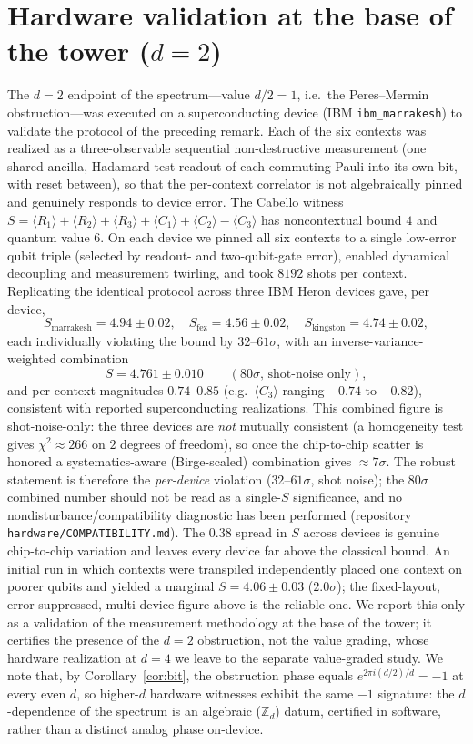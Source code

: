 \documentclass[11pt]{article}
\theoremstyle{remark}
\newcommand{\Z}{\mathbb{Z}}
\begin{document}
\section{Hardware validation at the base of the tower ($d=2$)}
The $d=2$ endpoint of the spectrum---value $d/2=1$, i.e.\ the Peres--Mermin obstruction---was executed
on a superconducting device (IBM \texttt{ibm\_marrakesh}) to validate the protocol of the preceding
remark. Each of the six contexts was realized as a three-observable sequential non-destructive
measurement (one shared ancilla, Hadamard-test readout of each commuting Pauli into its own bit, with
reset between), so that the per-context correlator is not algebraically pinned and genuinely responds
to device error. The Cabello witness
$S=\langle R_1\rangle+\langle R_2\rangle+\langle R_3\rangle+\langle C_1\rangle+\langle C_2\rangle
-\langle C_3\rangle$ has noncontextual bound $4$ and quantum value $6$. On each device we pinned all
six contexts to a single low-error qubit triple (selected by readout- and two-qubit-gate error),
enabled dynamical decoupling and measurement twirling, and took $8192$ shots per context. Replicating
the identical protocol across three IBM Heron devices gave, per device,
\[
S_{\mathrm{marrakesh}}=4.94\pm 0.02,\quad S_{\mathrm{fez}}=4.56\pm 0.02,\quad
S_{\mathrm{kingston}}=4.74\pm 0.02,
\]
each individually violating the bound by $32$--$61\sigma$, with an inverse-variance-weighted
combination
\[
S=4.761\pm 0.010\qquad(80\sigma\text{, shot-noise only}),
\]
and per-context magnitudes $0.74$--$0.85$ (e.g.\ $\langle C_3\rangle$ ranging $-0.74$ to $-0.82$),
consistent with reported superconducting realizations. This combined figure is shot-noise-only: the
three devices are \emph{not} mutually consistent (a homogeneity test gives $\chi^2\approx266$ on $2$
degrees of freedom), so once the chip-to-chip scatter is honored a systematics-aware (Birge-scaled)
combination gives $\approx7\sigma$. The robust statement is therefore the \emph{per-device} violation
($32$--$61\sigma$, shot noise); the $80\sigma$ combined number should not be read as a single-$S$
significance, and no nondisturbance/compatibility diagnostic has been performed (repository
\texttt{hardware/COMPATIBILITY.md}). The $0.38$ spread in $S$ across devices is
genuine chip-to-chip variation and leaves every device far above the classical bound. An initial run
in which contexts were transpiled independently placed one context on poorer qubits and yielded a
marginal $S=4.06\pm 0.03$ ($2.0\sigma$); the fixed-layout, error-suppressed, multi-device figure above
is the reliable one. We report this only as a validation of the measurement methodology at the base of
the tower; it certifies the presence of the $d=2$ obstruction, not the value grading, whose hardware
realization at $d=4$ we leave to the separate value-graded study. We note that, by
Corollary~\ref{cor:bit}, the obstruction phase equals $e^{2\pi i(d/2)/d}=-1$ at every even $d$, so
higher-$d$ hardware witnesses exhibit the same $-1$ signature: the $d$-dependence of the spectrum is an
algebraic ($\Z_d$) datum, certified in software, rather than a distinct analog phase on-device.
\end{document}
